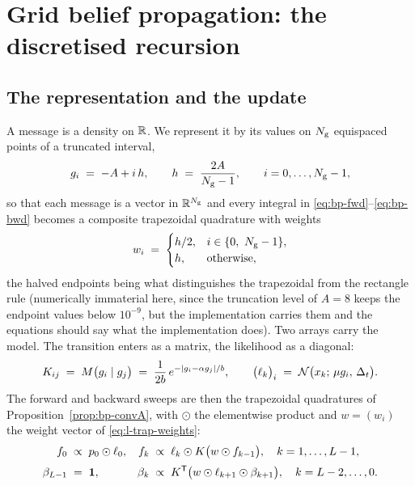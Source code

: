 \section{Grid belief propagation: the discretised recursion}
\label{sec:l-grid}

\subsection{The representation and the update}

A message is a density on $\mathbb{R}$. We represent it by its values on $N_{\mathrm{g}}$
equispaced points of a truncated interval,
\begin{equation}
  g_i \;=\; -A + i\,h, \qquad h \;=\; \frac{2A}{N_{\mathrm{g}} - 1},
  \qquad i = 0, \dots, N_{\mathrm{g}}-1,
  \label{eq:l-grid}
\end{equation}
so that each message is a vector in $\mathbb{R}^{N_{\mathrm{g}}}$ and every integral in
\eqref{eq:bp-fwd}--\eqref{eq:bp-bwd} becomes a composite trapezoidal
quadrature with weights
\begin{equation}
  w_i \;=\;
  \begin{cases}
    h/2, & i \in \{0,\ N_{\mathrm{g}}-1\},\\
    h,   & \text{otherwise},
  \end{cases}
  \label{eq:l-trap-weights}
\end{equation}
the halved endpoints being what distinguishes the trapezoidal from the
rectangle rule (numerically immaterial here, since the truncation level of
$A = 8$ keeps the endpoint values below $10^{-9}$, but the implementation
carries them and the equations should say what the implementation does). Two arrays carry the
model. The transition enters as a matrix, the likelihood as a diagonal:
\begin{equation}
  K_{ij} \;=\; M\big(g_i \mid g_j\big)
        \;=\; \frac{1}{2b}\, e^{-|g_i - \alpha g_j| / b},
  \qquad
  \big(\ell_k\big)_i
        \;=\; \mathcal{N}\big(x_k;\, \mu g_i,\, \Delta_t\big).
  \label{eq:l-grid-operators}
\end{equation}
The forward and backward sweeps are then the trapezoidal quadratures of
Proposition~\ref{prop:bp-convA}, with $\odot$ the elementwise product and
$w = (w_i)$ the weight vector of \eqref{eq:l-trap-weights}:
\begin{align}
  f_0 &\;\propto\; p_0 \odot \ell_0,
  &f_k &\;\propto\; \ell_k \odot K\big( w \odot f_{k-1} \big),
  \quad k = 1,\dots,L-1,
  \label{eq:l-grid-fwd}\\[2pt]
  \beta_{L-1} &\;=\; \mathbf{1},
  &\beta_k &\;\propto\; K^{\mathsf{T}} \big( w \odot \ell_{k+1} \odot \beta_{k+1} \big),
  \quad k = L-2,\dots,0 .
  \label{eq:l-grid-bwd}
\end{align}
